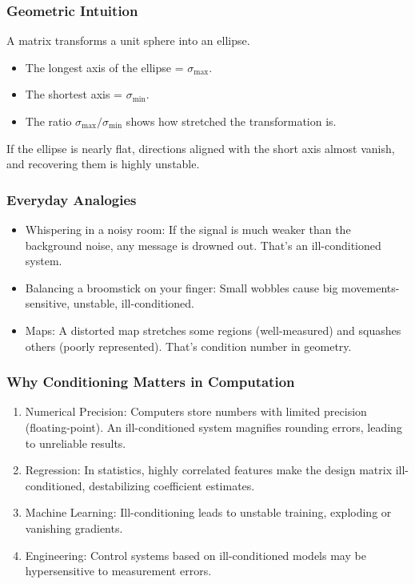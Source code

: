 \documentclass[
  letterpaper,
  DIV=11,
  numbers=noendperiod]{scrreprt}
\providecommand{\tightlist}{%
  \setlength{\itemsep}{0pt}\setlength{\parskip}{0pt}}
\begin{document}
\subsubsection{Geometric Intuition}\label{geometric-intuition-7}

A matrix transforms a unit sphere into an ellipse.

\begin{itemize}
\tightlist
\item
  The longest axis of the ellipse = \(\sigma_{\max}\).
\item
  The shortest axis = \(\sigma_{\min}\).
\item
  The ratio \(\sigma_{\max} / \sigma_{\min}\) shows how stretched the
  transformation is.
\end{itemize}

If the ellipse is nearly flat, directions aligned with the short axis
almost vanish, and recovering them is highly unstable.

\subsubsection{Everyday Analogies}\label{everyday-analogies-82}

\begin{itemize}
\tightlist
\item
  Whispering in a noisy room: If the signal is much weaker than the
  background noise, any message is drowned out. That's an
  ill-conditioned system.
\item
  Balancing a broomstick on your finger: Small wobbles cause big
  movements-sensitive, unstable, ill-conditioned.
\item
  Maps: A distorted map stretches some regions (well-measured) and
  squashes others (poorly represented). That's condition number in
  geometry.
\end{itemize}

\subsubsection{Why Conditioning Matters in
Computation}\label{why-conditioning-matters-in-computation}

\begin{enumerate}
\def\labelenumi{\arabic{enumi}.}
\tightlist
\item
  Numerical Precision: Computers store numbers with limited precision
  (floating-point). An ill-conditioned system magnifies rounding errors,
  leading to unreliable results.
\item
  Regression: In statistics, highly correlated features make the design
  matrix ill-conditioned, destabilizing coefficient estimates.
\item
  Machine Learning: Ill-conditioning leads to unstable training,
  exploding or vanishing gradients.
\item
  Engineering: Control systems based on ill-conditioned models may be
  hypersensitive to measurement errors.
\end{enumerate}
\end{document}
